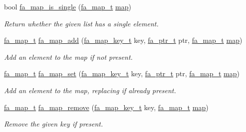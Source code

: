 \begin{DoxyCompactItemize}
bool \hyperlink{group___fa_map_gaa3f04a11ae175c8b8f9f916d05293ed3}{fa\-\_\-map\-\_\-is\-\_\-single} (\hyperlink{group___fa_map_gadcbb0c425af31be6aeb265159b2a7db0}{fa\-\_\-map\-\_\-t} \hyperlink{literals_8h_a44305f0bc81207be0dcc90650733e331}{map})
\begin{DoxyCompactList}\small\item\em Return whether the given list has a single element. \end{DoxyCompactList}\item 
\hyperlink{group___fa_map_gadcbb0c425af31be6aeb265159b2a7db0}{fa\-\_\-map\-\_\-t} \hyperlink{group___fa_map_gaf8b3b5cdac0cd00691754f0c7a0f87c6}{fa\-\_\-map\-\_\-add} (\hyperlink{group___fa_map_ga01c714699c14e805664c65b6a0ea974d}{fa\-\_\-map\-\_\-key\-\_\-t} key, \hyperlink{group___fa_ga915ddeae99ad7568b273d2b876425197}{fa\-\_\-ptr\-\_\-t} ptr, \hyperlink{group___fa_map_gadcbb0c425af31be6aeb265159b2a7db0}{fa\-\_\-map\-\_\-t} \hyperlink{literals_8h_a44305f0bc81207be0dcc90650733e331}{map})
\begin{DoxyCompactList}\small\item\em Add an element to the map if not present. \end{DoxyCompactList}\item 
\hyperlink{group___fa_map_gadcbb0c425af31be6aeb265159b2a7db0}{fa\-\_\-map\-\_\-t} \hyperlink{group___fa_map_ga91b515cb8f096af2f6ab3f7588ae41aa}{fa\-\_\-map\-\_\-set} (\hyperlink{group___fa_map_ga01c714699c14e805664c65b6a0ea974d}{fa\-\_\-map\-\_\-key\-\_\-t} key, \hyperlink{group___fa_ga915ddeae99ad7568b273d2b876425197}{fa\-\_\-ptr\-\_\-t} ptr, \hyperlink{group___fa_map_gadcbb0c425af31be6aeb265159b2a7db0}{fa\-\_\-map\-\_\-t} \hyperlink{literals_8h_a44305f0bc81207be0dcc90650733e331}{map})
\begin{DoxyCompactList}\small\item\em Add an element to the map, replacing if already present. \end{DoxyCompactList}\item 
\hyperlink{group___fa_map_gadcbb0c425af31be6aeb265159b2a7db0}{fa\-\_\-map\-\_\-t} \hyperlink{group___fa_map_ga73d68f263f542b076d0ae0cf4a62b5dd}{fa\-\_\-map\-\_\-remove} (\hyperlink{group___fa_map_ga01c714699c14e805664c65b6a0ea974d}{fa\-\_\-map\-\_\-key\-\_\-t} key, \hyperlink{group___fa_map_gadcbb0c425af31be6aeb265159b2a7db0}{fa\-\_\-map\-\_\-t} \hyperlink{literals_8h_a44305f0bc81207be0dcc90650733e331}{map})
\begin{DoxyCompactList}\small\item\em Remove the given key if present. \end{DoxyCompactList}\item 

\end{DoxyCompactItemize}
